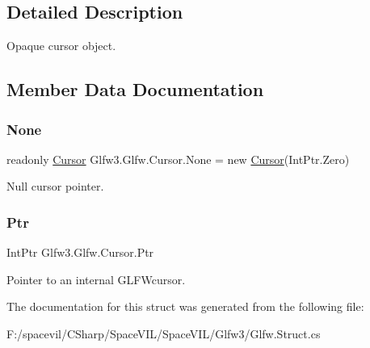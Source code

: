 \subsection{Detailed Description}
Opaque cursor object. 



\subsection{Member Data Documentation}
\mbox{\label{struct_glfw3_1_1_glfw_1_1_cursor_aa0c08d9f0ac0311fa2a09302ec493fb7}} 
\subsubsection{\texorpdfstring{None}{None}}
{\footnotesize\ttfamily readonly \mbox{\hyperlink{struct_glfw3_1_1_glfw_1_1_cursor}{Cursor}} Glfw3.\+Glfw.\+Cursor.\+None = new \mbox{\hyperlink{struct_glfw3_1_1_glfw_1_1_cursor}{Cursor}}(Int\+Ptr.\+Zero)\hspace{0.3cm}{\ttfamily [static]}}





Null cursor pointer.\mbox{\label{struct_glfw3_1_1_glfw_1_1_cursor_a7ac68cfb8aaf790598460dac88d81e11}} 
\subsubsection{\texorpdfstring{Ptr}{Ptr}}
{\footnotesize\ttfamily Int\+Ptr Glfw3.\+Glfw.\+Cursor.\+Ptr}



Pointer to an internal G\+L\+F\+Wcursor. 



The documentation for this struct was generated from the following file\+:\begin{DoxyCompactItemize}
\item 
F\+:/spacevil/\+C\+Sharp/\+Space\+V\+I\+L/\+Space\+V\+I\+L/\+Glfw3/Glfw.\+Struct.\+cs\end{DoxyCompactItemize}
